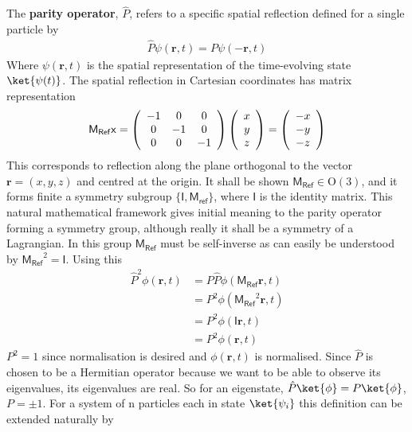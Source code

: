 The \textbf{parity operator}, $\hat{P}$, refers to a specific spatial reflection defined for a single particle by
\begin{align*}
\hat{P}\psi(\mathbf{r},t) = P\psi(-\mathbf{r},t) 
\end{align*}
Where $\psi(\mathbf{r},t)$ is the spatial representation of the time-evolving state $\ket{\psi(t)}$. The spatial reflection in Cartesian coordinates has matrix representation
\begin{align*}
\mathsf{M_{Ref}}\mathsf{x}=\left( \begin{array}{c c c} -1 & 0 &0 \\
0& -1&0 \\
0&0&-1 \end{array}\right)\left( \begin{array}{c} x\\y\\z \end{array} \right) = \left( \begin{array}{c} -x\\-y\\-z \end{array} \right)
\end{align*}
This corresponds to reflection along the plane orthogonal to the vector $\mathbf{r}=(x,y,z)$ and centred at the origin. It shall be shown $\mathsf{M_{Ref}}  \in \mathrm{O}(3)$, and it forms finite a symmetry subgroup $\{\mathsf{I},\mathsf{M_{ref}} \}$, where $\mathsf{I}$ is the identity matrix. This natural mathematical framework gives initial meaning to the parity operator forming a symmetry group, although really it shall be a symmetry of a Lagrangian. In this group $\mathsf{M_{Ref}}$ must be self-inverse as can easily be understood by $\mathsf{M_{Ref}}^2=\mathsf{I}$. Using this
\begin{align*}
\hat{P}^2\phi(\mathbf{r},t)&=P\hat{P}\phi(\mathsf{M_{Ref}}\mathbf{r},t)\\
&= P^2\phi(\mathsf{M_{Ref}}^2\mathbf{r},t)\\
&= P^2\phi(\mathsf{I}\mathbf{r},t)\\
&= P^2\phi(\mathbf{r},t)
\end{align*}
$P^2=1$ since normalisation is desired and $\phi(\mathbf{r},t)$ is normalised. Since $\hat{P}$ is chosen to be a Hermitian operator because we want to be able to observe its eigenvalues, its eigenvalues are real. So for an eigenstate, $\hat{P}\ket{\phi}=P\ket{\phi}$, $P=\pm 1$. For a system of n particles each in state $\ket{\psi_i}$ this definition can be extended naturally by
